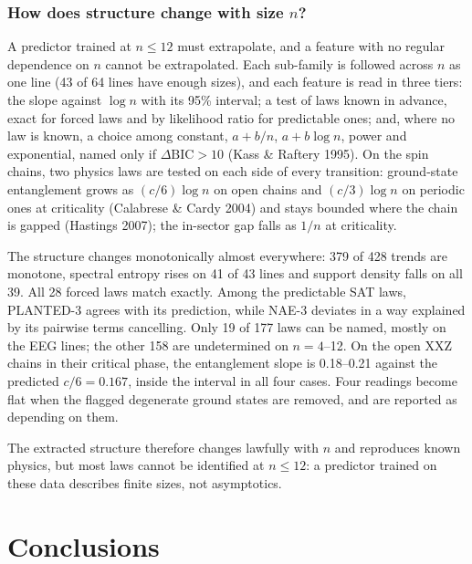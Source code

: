 \documentclass[10pt,a4paper]{article}
\begin{document}
\subsubsection{How does structure change with size $n$?}

A predictor trained at $n \leq 12$ must extrapolate, and a feature with no
regular dependence on $n$ cannot be extrapolated. Each sub-family is followed
across $n$ as one line (43 of 64 lines have enough sizes), and each feature is
read in three tiers: the slope against $\log n$ with its 95\% interval; a
test of laws known in advance, exact for forced laws and by likelihood ratio
for predictable ones; and, where no law is known, a choice among constant,
$a+b/n$, $a+b\log n$, power and exponential, named only if
$\Delta\mathrm{BIC} > 10$ (Kass \& Raftery 1995). On the spin chains, two
physics laws are tested on each side of every transition: ground-state
entanglement grows as $(c/6)\log n$ on open chains and $(c/3)\log n$ on
periodic ones at criticality (Calabrese \& Cardy 2004) and stays bounded where
the chain is gapped (Hastings 2007); the in-sector gap falls as $1/n$ at
criticality.

The structure changes monotonically almost everywhere: 379 of 428 trends are
monotone, spectral entropy rises on 41 of 43 lines and support density falls
on all 39. All 28 forced laws match exactly. Among the predictable SAT laws,
PLANTED-3 agrees with its prediction, while NAE-3 deviates in a way explained
by its pairwise terms cancelling. Only 19 of 177 laws can be named, mostly on
the EEG lines; the other 158 are undetermined on $n = 4$--12. On the open XXZ
chains in their critical phase, the entanglement slope is 0.18--0.21 against
the predicted $c/6 = 0.167$, inside the interval in all four cases. Four
readings become flat when the flagged degenerate ground states are removed,
and are reported as depending on them.

The extracted structure therefore changes lawfully with $n$ and reproduces
known physics, but most laws cannot be identified at $n \leq 12$: a predictor
trained on these data describes finite sizes, not asymptotics.

\section{Conclusions}
\end{document}
